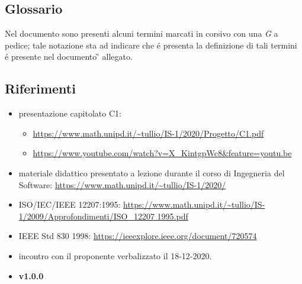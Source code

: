 \subsection{Glossario}
Nel documento sono presenti alcuni termini marcati in corsivo con una \emph{G} a pedice; tale notazione sta ad indicare che \'{e} presenta la definizione di tali termini \'{e} presente nel documento \G{} allegato.

\subsection{Riferimenti}
\begin{itemize}
    \item presentazione capitolato C1:
    \begin{itemize} 
        \item \url{https://www.math.unipd.it/~tullio/IS-1/2020/Progetto/C1.pdf}
        \item \url{https://www.youtube.com/watch?v=X_KintgpWc8&feature=youtu.be}
    \end{itemize}
    \item materiale didattico presentato a lezione durante il corso di Ingegneria del Software: \url{https://www.math.unipd.it/~tullio/IS-1/2020/}
    \item ISO/IEC/IEEE 12207:1995: \url{https://www.math.unipd.it/~tullio/IS-1/2009/Approfondimenti/ISO_12207 1995.pdf}
    \item IEEE Std 830 1998: \url{https://ieeexplore.ieee.org/document/720574}
    \item incontro con il proponente verbalizzato il 18-12-2020.
    \item \textbf{\NdP} \textbf{v1.0.0}
\end{itemize}